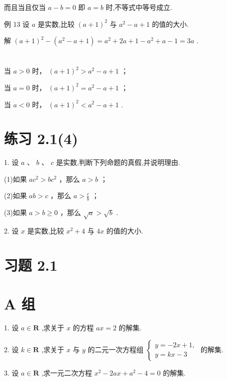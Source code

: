 \documentclass[10pt]{article}
\begin{document}
而且当且仅当 \(a - b = 0\) 即 \(a = b\) 时,不等式中等号成立.

例 13 设 \(a\) 是实数,比较 \({\left( a + 1\right) }^{2}\) 与 \({a}^{2} - a + 1\) 的值的大小.

解 \({\left( a + 1\right) }^{2} - \left( {{a}^{2} - a + 1}\right)  = {a}^{2} + {2a} + 1 - {a}^{2} + a - 1 = {3a}\) .



\section*{}

当 \(a > 0\) 时， \({\left( a + 1\right) }^{2} > {a}^{2} - a + 1\) ；

当 \(a = 0\) 时， \({\left( a + 1\right) }^{2} = {a}^{2} - a + 1\) ；

当 \(a < 0\) 时， \({\left( a + 1\right) }^{2} < {a}^{2} - a + 1\) .

\section*{练习 2.1(4)}

1. 设 \(a\text{ 、 }b\text{ 、 }c\) 是实数,判断下列命题的真假,并说明理由.

(1)如果 \(a{c}^{2} > b{c}^{2}\) ，那么 \(a > b\) ；

(2)如果 \({ab} > c\) ，那么 \(a > \frac{c}{b}\) ；

(3)如果 \(a > b \geq  0\) ，那么 \(\sqrt{a} > \sqrt{b}\) .

2. 设 \(x\) 是实数,比较 \({x}^{2} + 4\) 与 \({4x}\) 的值的大小.

\section*{习题 2.1}

\section*{A 组}

1. 设 \(a \in  \mathbf{R}\) ,求关于 \(x\) 的方程 \({ax} = 2\) 的解集.

2. 设 \(k \in  \mathbf{R}\) ,求关于 \(x\) 与 \(y\) 的二元一次方程组 \(\left\{  \begin{array}{l} y =  - {2x} + 1, \\  y = {kx} - 3 \end{array}\right.\) 的解集.

3. 设 \(a \in  \mathbf{R}\) ,求一元二次方程 \({x}^{2} - {2ax} + {a}^{2} - 4 = 0\) 的解集.
\end{document}
